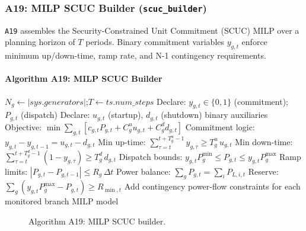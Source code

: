 \subsubsection{A19: MILP SCUC Builder (\texttt{scuc\_builder})}
\label{algo:a19}

\texttt{A19} assembles the Security-Constrained Unit Commitment (SCUC) MILP
over a planning horizon of $T$ periods.  Binary commitment variables
$y_{g,t}$ enforce minimum up/down-time, ramp rate, and N-1 contingency
requirements.

\paragraph{Algorithm A19: MILP SCUC Builder}
\begin{algorithmic}[1]
  \State $N_g \gets |\mathit{sys.generators}|$;\quad $T \gets \mathit{ts.num\_steps}$
  \State Declare: $y_{g,t} \in \{0,1\}$ (commitment); $P_{g,t}$ (dispatch)
  \State Declare: $u_{g,t}$ (startup), $d_{g,t}$ (shutdown) binary auxiliaries
  \State Objective:
    $\min \sum_{g,t} [c_{g,t}P_{g,t} + C_g^u u_{g,t} + C_g^d d_{g,t}]$
    \State Commitment logic: $y_{g,t} - y_{g,t-1} = u_{g,t} - d_{g,t}$
    \State Min up-time: $\sum_{\tau=t}^{t+T_g^u-1} y_{g,\tau} \ge T_g^u\,u_{g,t}$
    \State Min down-time: $\sum_{\tau=t}^{t+T_g^d-1}(1-y_{g,\tau}) \ge T_g^d\,d_{g,t}$
    \State Dispatch bounds: $y_{g,t}P_g^{\min} \le P_{g,t} \le y_{g,t}P_g^{\max}$
    \State Ramp limits: $|P_{g,t} - P_{g,t-1}| \le R_g\,\Delta t$
  \EndFor
    \State Power balance: $\sum_g P_{g,t} = \sum_i P_{L,i,t}$
    \State Reserve: $\sum_g (y_{g,t}P_g^{\max} - P_{g,t}) \ge R_{\min,t}$
  \EndFor
    \State Add contingency power-flow constraints for each monitored branch
  \EndIf
  \State \Return MILP model
\EndProcedure
\end{algorithmic}

\begin{figure}[H]
\centering
{}
\caption{Algorithm A19: MILP SCUC builder.}
\label{fig:a19-flow}
\end{figure}

